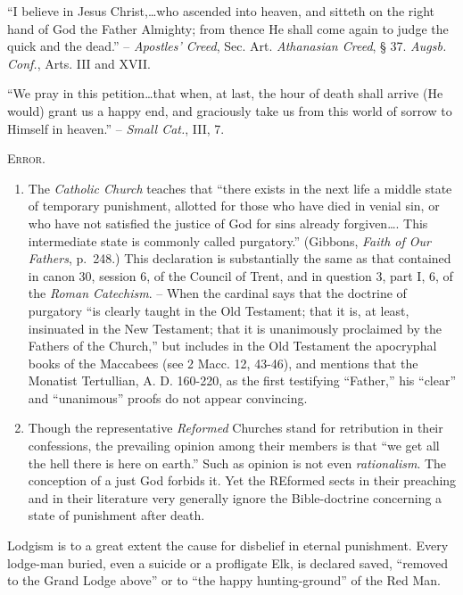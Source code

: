 \documentclass[
]{book}
\begin{document}
``I believe in Jesus Christ,\ldots who ascended into heaven, and sitteth on the right hand of God the Father Almighty; from thence He shall come again to judge the quick and the dead.'' -- \emph{Apostles' Creed}, Sec. Art. \emph{Athanasian Creed}, § 37. \emph{Augsb. Conf.}, Arts. III and XVII.

``We pray in this petition\ldots that when, at last, the hour of death shall arrive (He would) grant us a happy end, and graciously take us from this world of sorrow to Himself in heaven.'' -- \emph{Small Cat.}, III, 7.

\begin{center}
\textsc{Error.}
\end{center}

\begin{enumerate}
\def\labelenumi{\arabic{enumi}.}
\item
  The \emph{Catholic Church} teaches that ``there exists in the next life a middle state of temporary punishment, allotted for those who have died in venial sin, or who have not satisfied the justice of God for sins already forgiven\ldots. This intermediate state is commonly called purgatory.'' (Gibbons, \emph{Faith of Our Fathers}, p.~248.) This declaration is substantially the same as that contained in canon 30, session 6, of the Council of Trent, and in question 3, part I, 6, of the \emph{Roman Catechism}. -- When the cardinal says that the doctrine of purgatory ``is clearly taught in the Old Testament; that it is, at least, insinuated in the New Testament; that it is unanimously proclaimed by the Fathers of the Church,'' but includes in the Old Testament the apocryphal books of the Maccabees (see 2 Macc. 12, 43-46), and mentions that the Monatist Tertullian, A. D. 160-220, as the first testifying ``Father,'' his ``clear'' and ``unanimous'' proofs do not appear convincing.
\item
  Though the representative \emph{Reformed} Churches stand for retribution in their confessions, the prevailing opinion among their members is that ``we get all the hell there is here on earth.'' Such as opinion is not even \emph{rationalism}. The conception of a just God forbids it. Yet the REformed sects in their preaching and in their literature very generally ignore the Bible-doctrine concerning a state of punishment after death.
\end{enumerate}

Lodgism is to a great extent the cause for disbelief in eternal punishment. Every lodge-man buried, even a suicide or a profligate Elk, is declared saved, ``removed to the Grand Lodge above'' or to ``the happy hunting-ground'' of the Red Man.
\end{document}
